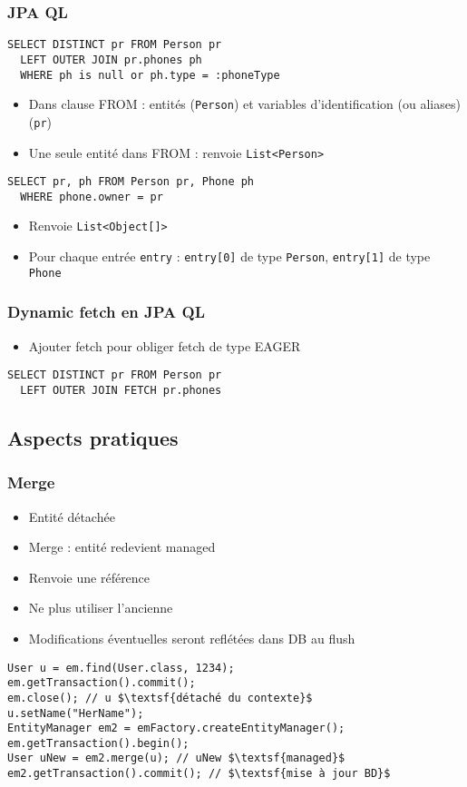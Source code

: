 \documentclass[english, french]{beamer}
\begin{document}
\begin{frame}[fragile]
	\frametitle{JPA QL}
	\begin{lstlisting}
SELECT DISTINCT pr FROM Person pr 
  LEFT OUTER JOIN pr.phones ph 
  WHERE ph is null or ph.type = :phoneType
	\end{lstlisting}
	\begin{itemize}
		\item Dans clause FROM : entités (\texttt{Person}) et variables d’identification (ou aliases) (\texttt{pr})
		\item Une seule entité dans FROM : renvoie \texttt{List<Person>}
	\end{itemize}
	\begin{lstlisting}
SELECT pr, ph FROM Person pr, Phone ph 
  WHERE phone.owner = pr
	\end{lstlisting}
	\begin{itemize}
		\item Renvoie \texttt{List<Object[]>}
		\item Pour chaque entrée \texttt{entry} : \texttt{entry[0]} de type \texttt{Person}, \texttt{entry[1]} de type \texttt{Phone}
	\end{itemize}
\end{frame}

\begin{frame}[fragile]
	\frametitle{Dynamic fetch en JPA QL}
	\begin{itemize}
		\item Ajouter fetch pour obliger fetch de type EAGER
	\end{itemize}
	\begin{lstlisting}
SELECT DISTINCT pr FROM Person pr 
  LEFT OUTER JOIN FETCH pr.phones
	\end{lstlisting}
\end{frame}

\subsection{Aspects pratiques}
\begin{frame}[fragile]
	\frametitle{Merge}
	\begin{itemize}
		\item Entité détachée
		\item Merge : entité redevient managed
		\item Renvoie une référence
		\item Ne plus utiliser l’ancienne
		\item Modifications éventuelles seront reflétées dans DB au flush
	\end{itemize}
	\begin{lstlisting}[escapechar=$]
User u = em.find(User.class, 1234);
em.getTransaction().commit();
em.close(); // u $\textsf{détaché du contexte}$
u.setName("HerName");
EntityManager em2 = emFactory.createEntityManager();
em.getTransaction().begin();
User uNew = em2.merge(u); // uNew $\textsf{managed}$
em2.getTransaction().commit(); // $\textsf{mise à jour BD}$
	\end{lstlisting}
\end{frame}
\end{document}
